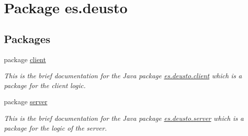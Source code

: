 \hypertarget{namespacees_1_1deusto}{}\section{Package es.\+deusto}
\label{namespacees_1_1deusto}
\subsection*{Packages}
\begin{DoxyCompactItemize}
\item 
package \hyperlink{namespacees_1_1deusto_1_1client}{client}
\begin{DoxyCompactList}\small\item\em This is the brief documentation for the Java package \hyperlink{namespacees_1_1deusto_1_1client}{es.\+deusto.\+client} which is a package for the client logic. \end{DoxyCompactList}\item 
package \hyperlink{namespacees_1_1deusto_1_1server}{server}
\begin{DoxyCompactList}\small\item\em This is the brief documentation for the Java package \hyperlink{namespacees_1_1deusto_1_1server}{es.\+deusto.\+server} which is a package for the logic of the server. \end{DoxyCompactList}\end{DoxyCompactItemize}
